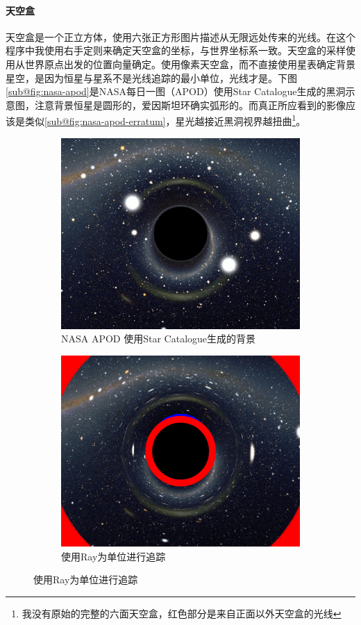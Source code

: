 \paragraph{天空盒}
天空盒是一个正立方体，使用六张正方形图片描述从无限远处传来的光线。在这个程序中我使用右手定则来确定天空盒的坐标，与世界坐标系一致。天空盒的采样使用从世界原点出发的位置向量确定。使用像素天空盒，而不直接使用星表确定背景星空，是因为恒星与星系不是光线追踪的最小单位，光线才是。下图\ref{sub@fig:nasa-apod}\cite{raytraceusingstarcatalogue}是NASA每日一图（APOD）使用Star Catalogue生成的黑洞示意图，注意背景恒星是圆形的，爱因斯坦环确实弧形的。而真正所应看到的影像应该是类似\ref{sub@fig:nasa-apod-erratum}，星光越接近黑洞视界越扭曲\footnote{我没有原始的完整的六面天空盒，红色部分是来自正面以外天空盒的光线}。
\begin{figure}[htbp]
    \centering
    \begin{subfigure}{.5\textwidth}
        \centering
        \includegraphics[width=.8\linewidth]{images/bhlens_riazuelo.jpg}
        \caption{NASA APOD 使用Star Catalogue生成的背景}
        \label{fig:nasa-apod}
    \end{subfigure}%
    \begin{subfigure}{.5\textwidth}
        \centering
        \includegraphics[width=.8\linewidth]{images/bhlens_erratum.png}
        \caption{使用Ray为单位进行追踪}
        \label{fig:nasa-apod-erratum}
    \end{subfigure}
\end{figure}



